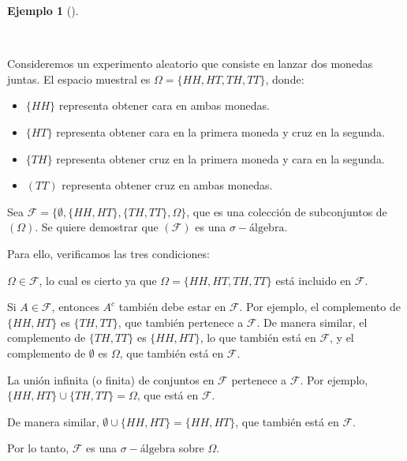 \documentclass[
  us-letterpaper,
]{scrreprt}
\theoremstyle{plain}
\theoremstyle{definition}
\theoremstyle{definition}
\newtheorem{example}{Ejemplo}[chapter]
\theoremstyle{remark}
\begin{document}
\begin{example}[]\protect\hypertarget{exm-ELmonedas}{}\label{exm-ELmonedas}

~

\begin{tcolorbox}[enhanced jigsaw, colback=white, toptitle=1mm, arc=.35mm, rightrule=.15mm, left=2mm, colframe=quarto-callout-caution-color-frame, breakable, leftrule=.75mm, colbacktitle=quarto-callout-caution-color!10!white, coltitle=black, opacityback=0, bottomtitle=1mm, bottomrule=.15mm, titlerule=0mm, opacitybacktitle=0.6, toprule=.15mm, title={Lanzamiento de dos monedas juntas}]

Consideremos un experimento aleatorio que consiste en lanzar dos monedas
juntas. El espacio muestral es \(\Omega = \{ HH, HT, TH, TT \}\), donde:

\begin{itemize}
  \item $\{HH\}$ representa obtener cara en ambas monedas.

  \item $\{HT\}$ representa obtener cara en la primera moneda y cruz en la segunda.

  \item $\{TH\}$ representa obtener cruz en la primera moneda y cara en la segunda.

  \item $(TT)$ representa obtener cruz en ambas monedas.

\end{itemize}

Sea \(\mathcal{F} = \{\emptyset, \{HH, HT\}, \{TH, TT\}, \Omega\}\), que
es una colección de subconjuntos de \((\Omega)\). Se quiere demostrar
que \((\mathcal{F})\) es una \(\sigma-\text{álgebra}\).

Para ello, verificamos las tres condiciones:

\(\Omega \in \mathcal{F}\), lo cual es cierto ya que
\(\Omega = \{HH, HT, TH, TT\}\) está incluido en \(\mathcal{F}\).

Si \(A \in \mathcal{F}\), entonces \(A^c\) también debe estar en
\(\mathcal{F}\). Por ejemplo, el complemento de \(\{HH, HT\}\) es
\(\{TH, TT\}\), que también pertenece a \(\mathcal{F}\). De manera
similar, el complemento de \(\{TH, TT\}\) es \(\{HH, HT\}\), lo que
también está en \(\mathcal{F}\), y el complemento de \(\emptyset\) es
\(\Omega\), que también está en \(\mathcal{F}\).

La unión infinita (o finita) de conjuntos en \(\mathcal{F}\) pertenece a
\(\mathcal{F}\). Por ejemplo, \(\{HH, HT\} \cup \{TH, TT\} = \Omega\),
que está en \(\mathcal{F}\).

De manera similar, \(\emptyset \cup \{HH, HT\} = \{HH, HT\}\), que
también está en \(\mathcal{F}\).

Por lo tanto, \(\mathcal{F}\) es una \(\sigma-\text{álgebra}\) sobre
\(\Omega\).

\end{tcolorbox}

\end{example}
\end{document}
